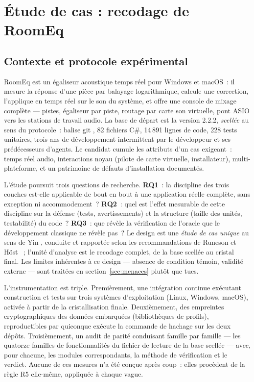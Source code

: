 \section{Étude de cas : recodage de RoomEq}\label{sec:etude}

\subsection{Contexte et protocole expérimental}\label{sec:protocole-etude}

RoomEq est un égaliseur acoustique temps réel pour Windows et macOS~: il
mesure la réponse d’une pièce par balayage logarithmique, calcule une
correction, l’applique en temps réel sur le son du système, et offre une
console de mixage complète — pistes, égaliseur par piste, routage par carte
son virtuelle, pont ASIO vers les stations de travail audio. La base de
départ est la version 2.2.2, \emph{scellée} au sens du protocole~: balise
git , 82 fichiers C\#, 14\,891 lignes de code, 228 tests
unitaires, trois ans de développement intermittent par le développeur et
ses prédécesseurs d’agents. Le candidat cumule les attributs d’un cas
exigeant~: temps réel audio, interactions noyau (pilote de carte virtuelle,
installateur), multi-plateforme, et un patrimoine de défauts d’installation
documentés.

L’étude poursuit trois questions de recherche. \textbf{RQ1}~: la discipline
des trois couches est-elle applicable de bout en bout à une application
réelle complète, sans exception ni accommodement~? \textbf{RQ2}~: quel est
l’effet mesurable de cette discipline sur la défense (tests, avertissements)
et la structure (taille des unités, testabilité) du code~?
\textbf{RQ3}~: que révèle la vérification de l’oracle que le
développement classique ne révèle pas~? Le design est une \emph{étude de
cas unique} au sens de Yin \cite{yin2018}, conduite et rapportée selon les
recommandations de Runeson et H{\"o}st \cite{runeson2009}~; l’unité
d’analyse est le recodage complet, de la base scellée au cristal final. Les
limites inhérentes à ce design — absence de condition témoin, validité
externe — sont traitées en section~\ref{sec:menaces} plutôt que tues.

L’instrumentation est triple. Premièrement, une intégration continue
exécutant construction et tests sur trois systèmes d’exploitation (Linux,
Windows, macOS), activée à partir de la cristallisation finale.
Deuxièmement, des empreintes cryptographiques des données embarquées
(bibliothèques de profils), reproductibles par quiconque exécute la
commande de hachage sur les deux dépôts. Troisièmement, un audit de parité
conduisant famille par famille — les quatorze familles de fonctionnalités
du fichier de lecture de la base scellée — avec, pour chacune, les modules
correspondants, la méthode de vérification et le verdict. Aucune de ces
mesures n’a été conçue après coup~: elles procèdent de la règle R5 elle-même,
appliquée à chaque vague.

